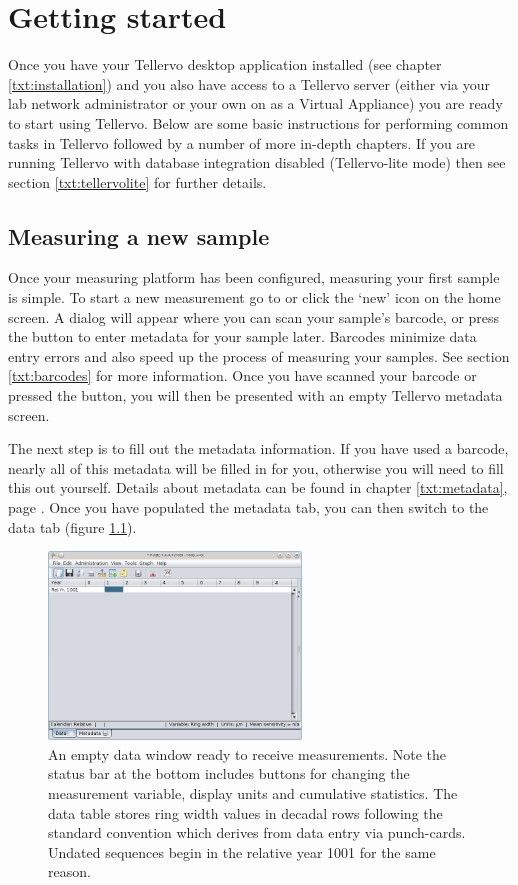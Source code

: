 
\chapter{Getting started}
\label{txt:gettingstarted}

Once you have your Tellervo desktop application installed (see chapter \ref{txt:installation}) and you also have access to a Tellervo server (either via your lab network administrator or your own on as a Virtual Appliance) you are ready to start using Tellervo.  Below are some basic instructions for performing common tasks in Tellervo followed by a number of more in-depth chapters.  If you are running Tellervo with database integration disabled (Tellervo-lite mode) then see section \ref{txt:tellervolite} for further details.

\section{Measuring a new sample}
\label{txt:new}
Once your measuring platform has been configured, measuring your first sample is simple.  To start a new measurement go to  or click the `new' icon on the home screen. A dialog will appear where you can scan your sample's barcode, or press the button to enter metadata for your sample later. Barcodes minimize data entry errors and also speed up the process of measuring your samples. See section \ref{txt:barcodes} for more information. Once you have scanned your barcode or pressed the button, you will then be presented with an empty Tellervo metadata screen.

The next step is to fill out the metadata information. If you have used a barcode, nearly all of this metadata will be filled in for you, otherwise you will need to fill this out yourself. Details about metadata can be found in chapter \ref{txt:metadata}, page \pageref{txt:metadata}.  Once you have populated the metadata tab, you can then switch to the data tab (figure \ref{fig:datascreen}).  

\begin{figure}[hbtp]
  \centering
    \includegraphics[width=0.6\textwidth]{Images/datascreen.png}
    \caption{An empty data window ready to receive measurements.  Note the status bar at the bottom includes buttons for changing the measurement variable, display units and cumulative statistics.  The data table stores ring width values in decadal rows following the standard convention which derives from data entry via punch-cards.  Undated sequences begin in the relative year 1001 for the same reason.}
    \label{fig:datascreen}
\end{figure}

